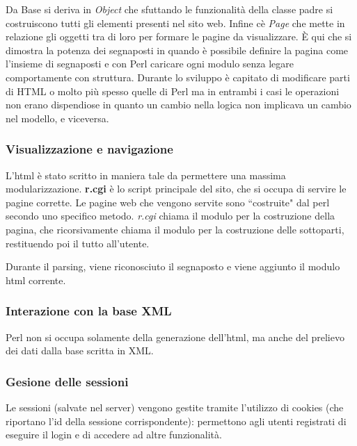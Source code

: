 Da Base si deriva in \textit{Object} che sfuttando le funzionalit\`a della classe padre si costruiscono tutti gli elementi presenti nel sito web. Infine c\`e \textit{Page} che mette in relazione gli oggetti tra di loro per formare le pagine da visualizzare. \`E qui che si dimostra la potenza dei segnaposti in quando \`e possibile definire la pagina come l'insieme di segnaposti e con Perl caricare ogni modulo senza legare comportamente con struttura.
Durante lo sviluppo \`e capitato di modificare parti di HTML o molto pi\`u spesso quelle di Perl ma in entrambi i casi le operazioni non erano dispendiose in quanto un cambio nella logica non implicava un cambio nel modello, e viceversa.

\subsubsection{Visualizzazione e navigazione}




L'html \`e stato scritto in maniera tale da permettere una massima modularizzazione. \textbf{r.cgi} \`e lo script principale del sito, che si occupa di servire le pagine corrette.
Le pagine web che vengono servite sono ``costruite" dal perl secondo uno specifico metodo. \textit{r.cgi} chiama il modulo per la costruzione della pagina, che ricorsivamente chiama il modulo per la costruzione delle sottoparti, restituendo poi il tutto all'utente.

Durante il parsing, viene riconosciuto il segnaposto e viene aggiunto il modulo html corrente.
\subsubsection{Interazione con la base XML}
Perl non si occupa solamente della generazione dell'html, ma anche del prelievo dei dati dalla base scritta in XML.
\subsubsection{Gesione delle sessioni}
Le sessioni (salvate nel server) vengono gestite tramite l'utilizzo di cookies (che riportano l'id della sessione corrispondente): permettono agli utenti registrati di eseguire il login e di accedere ad altre funzionalit\`a.
